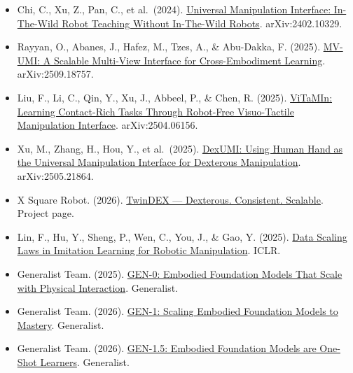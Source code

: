 \vspace{0.25em}
\begin{itemize}
\tightlist
\item
  Chi, C., Xu, Z., Pan, C., et al.~(2024). \href{https://arxiv.org/abs/2402.10329}{Universal Manipulation Interface: In-The-Wild Robot Teaching Without In-The-Wild Robots}. arXiv:2402.10329.
\item
  Rayyan, O., Abanes, J., Hafez, M., Tzes, A., \& Abu-Dakka, F. (2025). \href{https://arxiv.org/abs/2509.18757}{MV-UMI: A Scalable Multi-View Interface for Cross-Embodiment Learning}. arXiv:2509.18757.
\item
  Liu, F., Li, C., Qin, Y., Xu, J., Abbeel, P., \& Chen, R. (2025). \href{https://arxiv.org/abs/2504.06156}{ViTaMIn: Learning Contact-Rich Tasks Through Robot-Free Visuo-Tactile Manipulation Interface}. arXiv:2504.06156.
\item
  Xu, M., Zhang, H., Hou, Y., et al.~(2025). \href{https://arxiv.org/abs/2505.21864}{DexUMI: Using Human Hand as the Universal Manipulation Interface for Dexterous Manipulation}. arXiv:2505.21864.
\item
  X Square Robot. (2026). \href{https://x2robot.com/en/pages/twindex}{TwinDEX --- Dexterous. Consistent. Scalable}. Project page.
\item
  Lin, F., Hu, Y., Sheng, P., Wen, C., You, J., \& Gao, Y. (2025). \href{https://proceedings.iclr.cc/paper_files/paper/2025/hash/88b7b2c896506daabc8d3fd587055167-Abstract-Conference.html}{Data Scaling Laws in Imitation Learning for Robotic Manipulation}. ICLR.
\item
  Generalist Team. (2025). \href{https://generalistai.com/blog/gen-0}{GEN-0: Embodied Foundation Models That Scale with Physical Interaction}. Generalist.
\item
  Generalist Team. (2026). \href{https://generalistai.com/blog/gen-1}{GEN-1: Scaling Embodied Foundation Models to Mastery}. Generalist.
\item
  Generalist Team. (2026). \href{https://generalistai.com/blog/gen-1.5}{GEN-1.5: Embodied Foundation Models are One-Shot Learners}. Generalist.
\end{itemize}

\clearpage
